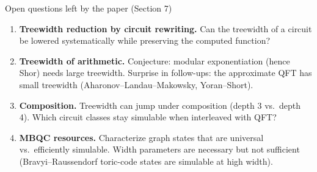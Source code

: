 \begin{frame}{Open questions left by the paper (Section 7)}
    \begin{enumerate}
        \item \textbf{Treewidth reduction by circuit rewriting.} Can the treewidth of a circuit be lowered systematically while preserving the computed function?
        \item \textbf{Treewidth of arithmetic.} Conjecture: modular exponentiation (hence Shor) needs large treewidth. Surprise in follow-ups: the approximate QFT has small treewidth (Aharonov--Landau--Makowsky, Yoran--Short).
        \item \textbf{Composition.} Treewidth can jump under composition (depth 3 vs.\ depth 4). Which circuit classes stay simulable when interleaved with QFT?
        \item \textbf{MBQC resources.} Characterize graph states that are universal vs.\ efficiently simulable. Width parameters are necessary but not sufficient (Bravyi--Raussendorf toric-code states are simulable at high width).
    \end{enumerate}
\end{frame}
